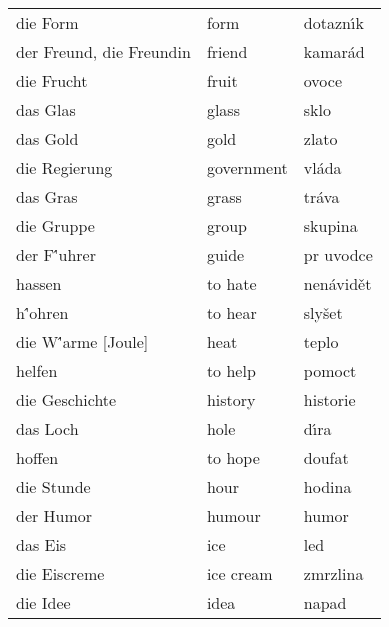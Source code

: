\documentclass[11pt]{article}
\begin{document}
\begin{longtable}{lll}
 die Form                         &  form                     &  dotazn\'\i k        \\
 der Freund, die Freundin         &  friend                   &  kamar\'ad           \\
 die Frucht                       &  fruit                    &  ovoce               \\
 das Glas                         &  glass                    &  sklo                \\
 das Gold                         &  gold                     &  zlato               \\
 die Regierung                    &  government               &  vl\'ada             \\
 das Gras                         &  grass                    &  tr\'ava             \\
 die Gruppe                       &  group                    &  skupina             \\
 der F\''uhrer                    &  guide                    &  pr\accent23 uvodce  \\
 hassen                           &  to hate                  &  nen\'avid\v et      \\
 h\''ohren                        &  to hear                  &  sly\v set           \\
 die W\''arme [Joule]             &  heat                     &  teplo               \\
 helfen                           &  to help                  &  pomoct              \\
 die Geschichte                   &  history                  &  historie            \\
 das Loch                         &  hole                     &  d\'\i ra            \\
 hoffen                           &  to hope                  &  doufat              \\
 die Stunde                       &  hour                     &  hodina              \\
 der Humor                        &  humour                   &  humor               \\
 das Eis                          &  ice                      &  led                 \\
 die Eiscreme                     &  ice cream                &  zmrzlina            \\
 die Idee                         &  idea                     &  napad               \\

\end{longtable}
\end{document}
